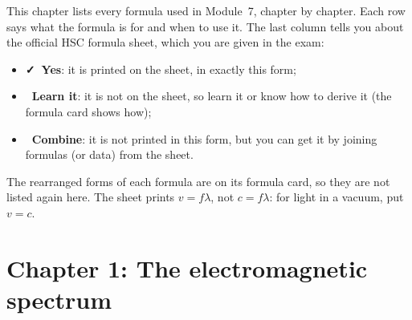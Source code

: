 \label{fs:start}

This chapter lists every formula used in Module~7, chapter by chapter. Each row says what the
formula is for and when to use it. The last column tells you about the official HSC formula
sheet, which you are given in the exam:
\begin{itemize}
  \item \textcolor{hscformula}{\footnotesize\bfseries\faCheck\ Yes}: it is printed on the
        sheet, in exactly this form;
  \item \textcolor{hscmistake}{\footnotesize\bfseries\faTimes\ Learn it}: it is not on the
        sheet, so learn it or know how to derive it (the formula card shows how);
  \item \textcolor{hsctiptext}{\footnotesize\bfseries\faLink\ Combine}: it is not printed in
        this form, but you can get it by joining formulas (or data) from the sheet.
\end{itemize}
The rearranged forms of each formula are on its formula card, so they are not listed again
here. The sheet prints $v = f\lambda$, not $c = f\lambda$: for light in a vacuum, put
$v = c$.

\section*{Chapter 1: The electromagnetic spectrum}

\begin{formulatable}
\end{formulatable}

